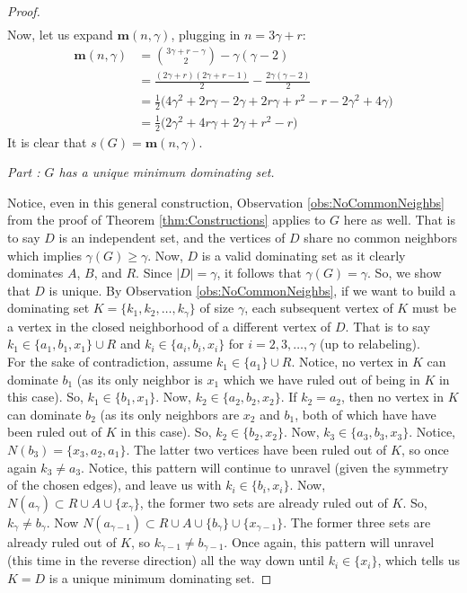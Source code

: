 \documentclass[12pt]{amsart}
\makeatletter
\newcounter{proofpart}
\newcommand{\proofpart}[1]{%
  \par
  \addvspace{\medskipamount}%
  \stepcounter{proofpart}%
  \noindent\emph{Part \theproofpart: #1}\par\nobreak\smallskip
  \@afterheading
}
\makeatother
\begin{document}
\begin{proof}
\begin{align*}
\end{align*}
Now, let us expand $\mathbf{m}(n,\gamma)$, plugging in $n = 3\gamma + r$:
\begin{align*}
    \mathbf{m}(n,\gamma) &= {3\gamma + r - \gamma\choose{2}} - \gamma(\gamma-2)\\
    &=\frac{(2\gamma + r)(2\gamma + r-1)}{2} - \frac{2\gamma(\gamma-2)}{2}\\
    &= \frac{1}{2}\bigg(4\gamma^2 + 2r\gamma -2\gamma + 2r\gamma + r^2 - r -2\gamma^2 + 4\gamma \bigg)\\
    &=  \boxed{\frac{1}{2}\bigg(2\gamma^2 + 4r\gamma + 2\gamma + r^2 - r \bigg)}
\end{align*}
It is clear that $s(G) = \mathbf{m}(n,\gamma)$.
\proofpart{$G$ has a unique minimum dominating set.}
Notice, even in this general construction, Observation \ref{obs:NoCommonNeighbs} from the proof of Theorem \ref{thm:Constructions} applies to $G$ here as well. That is to say $D$ is an independent set, and the vertices of $D$ share no common neighbors which implies $\gamma(G) \geq \gamma$. Now, $D$ is a valid dominating set as it clearly dominates $A$, $B$, and $R$. Since $|D| = \gamma$, it follows that $\gamma(G) = \gamma$. So, we show that $D$ is unique. By Observation \ref{obs:NoCommonNeighbs}, if we want to build a dominating set $K = \{k_1,k_2,\ldots,k_\gamma\}$ of size $\gamma$, each subsequent vertex of $K$ must be a vertex in the closed neighborhood of a different vertex of $D$. That is to say $k_1 \in \{a_1,b_1,x_1\} \cup R$ and $k_i \in \{a_i,b_i,x_i\}$ for $i = 2,3,\ldots,\gamma$ (up to relabeling).\\
For the sake of contradiction, assume $k_1 \in \{a_1\} \cup R$. Notice, no vertex in $K$ can dominate $b_1$ (as its only neighbor is $x_1$ which we have ruled out of being in $K$ in this case). So, $k_1 \in \{b_1,x_1\}$. Now, $k_2 \in \{a_2,b_2,x_2\}$. If $k_2 = a_2$, then no vertex in $K$ can dominate $b_2$ (as its only neighbors are $x_2$ and $b_1$, both of which have have been ruled out of $K$ in this case). So, $k_2 \in \{b_2,x_2\}$. Now, $k_3 \in \{a_3,b_3,x_3\}$. Notice, $N(b_3) = \{x_3,a_2,a_1\}$. The latter two vertices have been ruled out of $K$, so once again $k_3 \not=a_3$. Notice, this pattern will continue to unravel (given the symmetry of the chosen edges), and leave us with $k_i \in \{b_i,x_i\}$. Now, $N(a_\gamma) \subset R \cup A \cup \{x_\gamma\}$, the former two sets are already ruled out of $K$. So, $k_\gamma \not= b_\gamma$. Now $N(a_{\gamma - 1}) \subset R\cup A \cup \{b_{\gamma}\} \cup \{x_{\gamma - 1} \}$. The former three sets are already ruled out of $K$, so $k_{\gamma-1} \not =b_{\gamma - 1}$. Once again, this pattern will unravel (this time in the reverse direction) all the way down until $k_i \in \{x_i\}$, which tells us $K = D$ is a unique minimum dominating set.
\end{proof}
\end{document}
